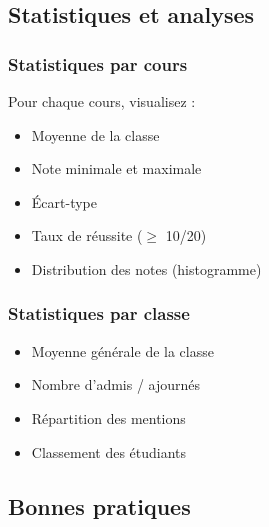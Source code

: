 \subsection{Statistiques et analyses}

\subsubsection{Statistiques par cours}

Pour chaque cours, visualisez :
\begin{itemize}[leftmargin=*]
    \item Moyenne de la classe
    \item Note minimale et maximale
    \item Écart-type
    \item Taux de réussite ($\geq$ 10/20)
    \item Distribution des notes (histogramme)
\end{itemize}

\subsubsection{Statistiques par classe}

\begin{itemize}[leftmargin=*]
    \item Moyenne générale de la classe
    \item Nombre d'admis / ajournés
    \item Répartition des mentions
    \item Classement des étudiants
\end{itemize}

\subsection{Bonnes pratiques}

